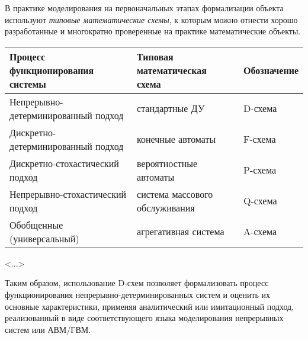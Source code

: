 В практике моделирования на первоначальных этапах формализации объекта используют \textit{типовые математические схемы}, к которым можно отнести хорошо разработанные и многократно проверенные на практике математические объекты.

\begin{table}
    \renewcommand{\arraystretch}{1.5}
    \begin{tabularx}{\textwidth} {
            >{\raggedright\arraybackslash}X
            >{\centering\arraybackslash}X
            >{\centering\arraybackslash}X}
        \toprule
        \textbf{Процесс функционирования системы} & \textbf{Типовая математическая схема} & \textbf{Обозначение} \\
        \midrule
        Непрерывно-детерминированный подход       & стандартные ДУ                        & D-схема              \\
        Дискретно-детерминированный подход        & конечные автоматы                     & F-схема              \\
        Дискретно-стохастический подход           & вероятностные автоматы                & P-схема              \\
        Непрерывно-стохастический подход          & система массового обслуживания        & Q-схема              \\
        Обобщенные (универсальный)                & агрегативная система                  & A-схема              \\
        \bottomrule
    \end{tabularx}
\end{table}

<...>

Таким образом, использование D-схем позволяет формализовать процесс функционирования непрерывно-детерминированных систем и оценить их основные характеристики, применяя аналитический или имитационный подход, реализованный в виде соответствующего языка моделирования непрерывных систем или АВМ/ГВМ.